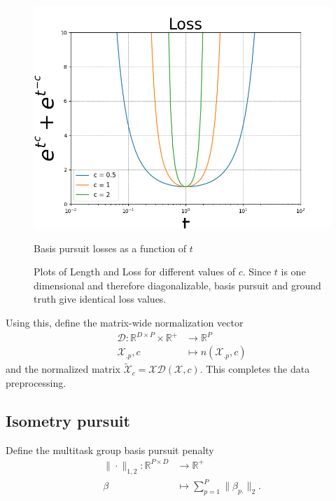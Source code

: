 \begin{figure}[htbp]
    \begin{minipage}{0.32\textwidth}
        \centering
        \includegraphics[width=\textwidth]{../figures/Figure_1b.png}
        \caption{Basis pursuit losses as a function of $t$}
        \label{fig:loss}
    \end{minipage}
    \caption{Plots of Length and Loss for different values of $c$.
    Since $t$ is one dimensional and therefore diagonalizable, basis pursuit and ground truth give identical loss values.}
    \label{fig:results}
\end{figure}


Using this, define the matrix-wide normalization vector
\begin{align}
\mathcal D: \mathbb R^{D \times P} \times \mathbb R^+ &\to \mathbb R^P \\
\mathcal X_{.p}, c &\mapsto n(\mathcal X_{.p}, c)
\end{align}
and the normalized matrix $\tilde {\mathcal X}_c = \mathcal X \mathcal D(\mathcal X, c).$
This completes the data preprocessing.



\subsection{Isometry pursuit}

Define the multitask group basis pursuit penalty %
\begin{align}
\label{eq:bp}
\| \cdot \|_{1,2}: \mathbb R^{P \times D} &\to \mathbb R^+ \\ 
\beta &\mapsto  \sum_{p=1}^P  \|\beta_{p.}\|_2.
\end{align}

